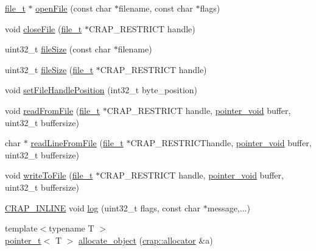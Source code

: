 \begin{DoxyCompactItemize}
\item 
\hyperlink{namespacecrap_afd3eedf00a9de7958b7dd70aafff79a4}{file\+\_\+t} $\ast$ \hyperlink{namespacecrap_a95e7097ddb2306595f5b806a08268785}{open\+File} (const char $\ast$filename, const char $\ast$flags)
\item 
void \hyperlink{namespacecrap_ae3f7572940d5aa57594264a780d59789}{close\+File} (\hyperlink{namespacecrap_afd3eedf00a9de7958b7dd70aafff79a4}{file\+\_\+t} $\ast$C\+R\+A\+P\+\_\+\+R\+E\+S\+T\+R\+I\+C\+T handle)
\item 
uint32\+\_\+t \hyperlink{namespacecrap_a33ebe4053661b1006d88f1082cebbd1b}{file\+Size} (const char $\ast$filename)
\item 
uint32\+\_\+t \hyperlink{namespacecrap_aadea1555cd17b168f91b3d03171b8179}{file\+Size} (\hyperlink{namespacecrap_afd3eedf00a9de7958b7dd70aafff79a4}{file\+\_\+t} $\ast$C\+R\+A\+P\+\_\+\+R\+E\+S\+T\+R\+I\+C\+T handle)
\item 
void \hyperlink{namespacecrap_a3a5d242b2926fdc057a72fa3387d076c}{set\+File\+Handle\+Position} (int32\+\_\+t byte\+\_\+position)
\item 
void \hyperlink{namespacecrap_a9aabeee93bb15d29856ac9fad19a012f}{read\+From\+File} (\hyperlink{namespacecrap_afd3eedf00a9de7958b7dd70aafff79a4}{file\+\_\+t} $\ast$C\+R\+A\+P\+\_\+\+R\+E\+S\+T\+R\+I\+C\+T handle, \hyperlink{namespacecrap_aa4cb82451ede6b73c49d862af29aebb3}{pointer\+\_\+void} buffer, uint32\+\_\+t buffersize)
\item 
char $\ast$ \hyperlink{namespacecrap_a88b135bd26154fde9e09c9638523203d}{read\+Line\+From\+File} (\hyperlink{namespacecrap_afd3eedf00a9de7958b7dd70aafff79a4}{file\+\_\+t} $\ast$C\+R\+A\+P\+\_\+\+R\+E\+S\+T\+R\+I\+C\+Thandle, \hyperlink{namespacecrap_aa4cb82451ede6b73c49d862af29aebb3}{pointer\+\_\+void} buffer, uint32\+\_\+t buffersize)
\item 
void \hyperlink{namespacecrap_a44ce23333dcd545198f1ca1687059a63}{write\+To\+File} (\hyperlink{namespacecrap_afd3eedf00a9de7958b7dd70aafff79a4}{file\+\_\+t} $\ast$C\+R\+A\+P\+\_\+\+R\+E\+S\+T\+R\+I\+C\+T handle, \hyperlink{namespacecrap_aa4cb82451ede6b73c49d862af29aebb3}{pointer\+\_\+void} buffer, uint32\+\_\+t buffersize)
\item 
\hyperlink{config__x86_8h_a5a40526b8d842e7ff731509998bb0f1c}{C\+R\+A\+P\+\_\+\+I\+N\+L\+I\+N\+E} void \hyperlink{namespacecrap_a8259cc46db12f668a9e94f654143415f}{log} (uint32\+\_\+t flags, const char $\ast$message,...)
\item 
{\footnotesize template$<$typename T $>$ }\\\hyperlink{structcrap_1_1pointer__t}{pointer\+\_\+t}$<$ T $>$ \hyperlink{namespacecrap_a4d0aabb9bf7605594f9d8b0ac0ebc6ef}{allocate\+\_\+object} (\hyperlink{classcrap_1_1allocator}{crap\+::allocator} \&a)

\end{DoxyCompactItemize}
